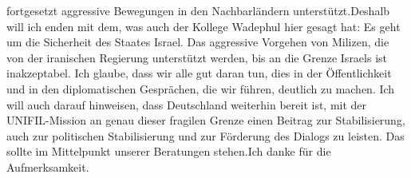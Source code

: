 \documentclass{article}
\begin{document}
fortgesetzt aggressive Bewegungen in den Nachbarländern unterstützt.Deshalb will ich enden mit dem, was auch der Kollege Wadephul hier gesagt hat: Es geht um die Sicherheit des Staates Israel. Das aggressive Vorgehen von Milizen, die von der iranischen Regierung unterstützt werden, bis an die Grenze Israels ist inakzeptabel. Ich glaube, dass wir alle gut daran tun, dies in der Öffentlichkeit und in den diplomatischen Gesprächen, die wir führen, deutlich zu machen. Ich will auch darauf hinweisen, dass Deutschland weiterhin bereit ist, mit der UNIFIL-Mission an genau dieser fragilen Grenze einen Beitrag zur Stabilisierung, auch zur politischen Stabilisierung und zur Förderung des Dialogs zu leisten. Das sollte im Mittelpunkt unserer Beratungen stehen.Ich danke für die Aufmerksamkeit.
\end{document}
